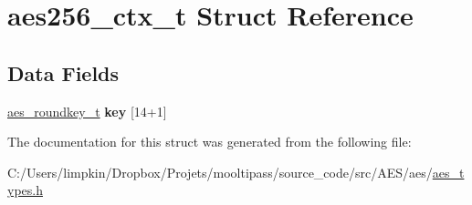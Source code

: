 \hypertarget{structaes256__ctx__t}{\section{aes256\-\_\-ctx\-\_\-t Struct Reference}
\label{structaes256__ctx__t}
}
\subsection*{Data Fields}
\begin{DoxyCompactItemize}
\item 
\hypertarget{structaes256__ctx__t_aac9ff4933a314ba93b4bec6e92199d17}{\hyperlink{structaes__roundkey__t}{aes\-\_\-roundkey\-\_\-t} {\bfseries key} \mbox{[}14+1\mbox{]}}\label{structaes256__ctx__t_aac9ff4933a314ba93b4bec6e92199d17}

\end{DoxyCompactItemize}


The documentation for this struct was generated from the following file\-:\begin{DoxyCompactItemize}
\item 
C\-:/\-Users/limpkin/\-Dropbox/\-Projets/mooltipass/source\-\_\-code/src/\-A\-E\-S/aes/\hyperlink{aes__types_8h}{aes\-\_\-types.\-h}\end{DoxyCompactItemize}
